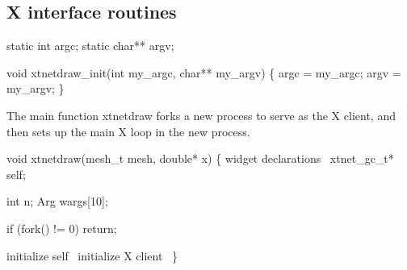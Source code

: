 \subsection{X interface routines}

\nwenddocs{}\plusendmoddef\nwstartdeflinemarkup{}\nwenddeflinemarkup
static int    argc;
static char** argv;

\nwendcode{}\nwdocspar

\nwenddocs{}\endmoddef\nwstartdeflinemarkup{}\nwenddeflinemarkup
void xtnetdraw_init(int my_argc, char** my_argv)
\{
    argc = my_argc;
    argv = my_argv;
\}

\nwendcode{}\nwdocspar

The main function {\Tt{}xtnetdraw\nwendquote} forks a new process to serve
as the X client, and then sets up the main X loop in the new
process.

\nwenddocs{}\plusendmoddef\nwstartdeflinemarkup{}\nwenddeflinemarkup
void xtnetdraw(mesh_t mesh, double* x)
\{
    \LA{}widget declarations~{\nwtagstyle{}}\RA{}
    xtnet_gc_t* self;

    int n;
    Arg wargs[10];

    if (fork() != 0)
        return;

    \LA{}initialize \code{}self\edoc{}~{\nwtagstyle{}}\RA{}
    \LA{}initialize X client~{\nwtagstyle{}}\RA{}
\}

